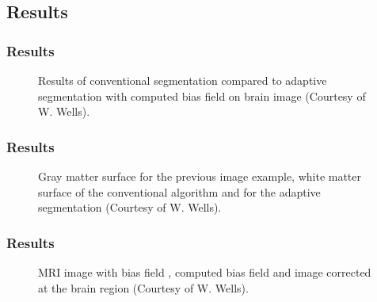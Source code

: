 \subsection{Results}

\begin{frame}
  \frametitle{Results}

  \begin{figure}
    \centering
    \caption{\footnotesize Results of conventional segmentation  compared to adaptive segmentation  with computed bias field  on brain image 
(Courtesy of W. Wells).}
  \end{figure}
\end{frame}


\begin{frame}
  \frametitle{Results \cont}

  \begin{figure}
    \centering
    \caption{\footnotesize Gray matter surface  for the previous image example, white matter surface of the conventional algorithm  and for the adaptive segmentation   (Courtesy of W. Wells).}
  \end{figure}
\end{frame}


\begin{frame}
  \frametitle{Results \cont}

  \begin{figure}
    \centering
    \caption{\footnotesize MRI image with bias field , computed bias field  and image corrected at the brain region  (Courtesy of W. Wells).}
  \end{figure}
\end{frame}


